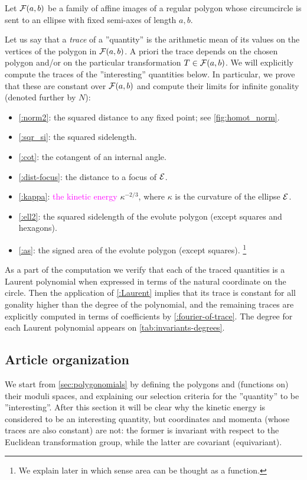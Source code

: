 % 

Let $\mathcal{F}(a,b)$ be a family of affine images of a regular polygon
whose circumcircle is sent to an ellipse with fixed semi-axes of length $a,b$.

Let us say that a \emph{trace} of a ''quantity'' is the arithmetic mean of its values on the vertices of the polygon in $\mathcal{F}(a,b)$.
A priori the trace depends on the chosen polygon and/or on the particular transformation $T\in\mathcal{F}(a,b)$.
We will explicitly compute the traces of the ''interesting'' quantities below.
In particular, we prove that these are constant over $\mathcal{F}(a,b)$
and compute their limits for infinite gonality (denoted further by $N$):

\begin{itemize} \itemsep0em
    \item \eqref{:norm2}: the squared distance to any fixed point; see \cref{fig:homot_norm}.
    \item \eqref{:sqr_si}: the squared sidelength.
    \item \eqref{:cot}: the cotangent of an internal angle.
    \item \eqref{:dist-focus}: the distance to a focus of $\mathcal{E}$.
    \item \eqref{:kappa}: \textcolor{magenta}{the kinetic energy} $\kappa^{-2/3}$, where $\kappa$ is the curvature of the ellipse $\mathcal{E}$.
    \item \eqref{:ell2}: the squared sidelength of the evolute polygon (except squares and hexagons). 
    \item \eqref{:as}: the signed area of the evolute polygon (except squares).
\footnote{We explain later in which sense area can be thought as a function.}
\end{itemize}

As a part of the computation
we verify that each of the traced quantities is a Laurent polynomial
when expressed in terms of the natural coordinate on the circle.
Then the application of \cref{:Laurent}
implies that its trace is constant for all gonality higher than the degree of the polynomial,
and the remaining traces are explicitly computed in terms of coefficients by \cref{:fourier-of-trace}. The degree for each Laurent polynomial appears on \cref{tab:invariants-degrees}.

\subsection*{Article organization}
We start from \cref{sec:polygonomials}
by defining the polygons and (functions on) their moduli spaces,
and explaining our selection criteria
for the ''quantity'' to be ''interesting''.
After this section it will be clear why the kinetic energy
is considered to be an interesting quantity,
but coordinates and momenta (whose traces are also constant) are not:
the former is invariant with respect to the Euclidean transformation group,
while the latter are covariant (equivariant).

